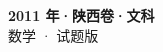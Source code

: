 \documentclass[zihao=-4, a4paper]{ctexart}
\begin{document}
\begin{center}
  {\Large\bfseries 2011 年·陕西卷·文科}\\[4pt]
  {\large 数学 · 试题版}
\end{center}
\medskip
{}

\end{document}
